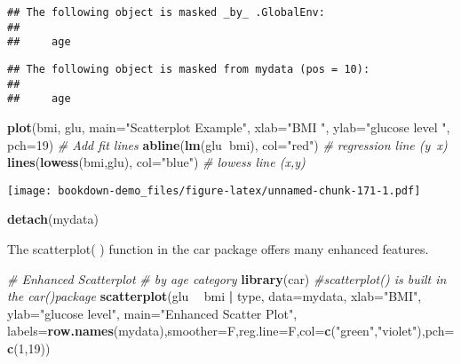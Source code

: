 \documentclass[]{book}
\newenvironment{Shaded}{\begin{snugshade}}{\end{snugshade}}
\newcommand{\KeywordTok}[1]{\textcolor[rgb]{0.13,0.29,0.53}{\textbf{#1}}}
\newcommand{\DataTypeTok}[1]{\textcolor[rgb]{0.13,0.29,0.53}{#1}}
\newcommand{\DecValTok}[1]{\textcolor[rgb]{0.00,0.00,0.81}{#1}}
\newcommand{\StringTok}[1]{\textcolor[rgb]{0.31,0.60,0.02}{#1}}
\newcommand{\CommentTok}[1]{\textcolor[rgb]{0.56,0.35,0.01}{\textit{#1}}}
\newcommand{\OperatorTok}[1]{\textcolor[rgb]{0.81,0.36,0.00}{\textbf{#1}}}
\newcommand{\NormalTok}[1]{#1}
\theoremstyle{definition}
\theoremstyle{definition}
\theoremstyle{definition}
\theoremstyle{remark}
\begin{document}
\begin{verbatim}
## The following object is masked _by_ .GlobalEnv:
## 
##     age
\end{verbatim}

\begin{verbatim}
## The following object is masked from mydata (pos = 10):
## 
##     age
\end{verbatim}

\begin{Shaded}
\begin{Highlighting}[]
\KeywordTok{plot}\NormalTok{(bmi, glu, }\DataTypeTok{main=}\StringTok{"Scatterplot Example"}\NormalTok{, }
    \DataTypeTok{xlab=}\StringTok{"BMI "}\NormalTok{, }\DataTypeTok{ylab=}\StringTok{"glucose level "}\NormalTok{, }\DataTypeTok{pch=}\DecValTok{19}\NormalTok{)}
\CommentTok{# Add fit lines}
\KeywordTok{abline}\NormalTok{(}\KeywordTok{lm}\NormalTok{(glu}\OperatorTok{~}\NormalTok{bmi), }\DataTypeTok{col=}\StringTok{"red"}\NormalTok{) }\CommentTok{# regression line (y~x) }
\KeywordTok{lines}\NormalTok{(}\KeywordTok{lowess}\NormalTok{(bmi,glu), }\DataTypeTok{col=}\StringTok{"blue"}\NormalTok{) }\CommentTok{# lowess line (x,y)}
\end{Highlighting}
\end{Shaded}

\texttt{[image: bookdown-demo\_files/figure-latex/unnamed-chunk-171-1.pdf]}

\begin{Shaded}
\begin{Highlighting}[]
\KeywordTok{detach}\NormalTok{(mydata)}
\end{Highlighting}
\end{Shaded}

The scatterplot( ) function in the car package offers many enhanced
features.

\begin{Shaded}
\begin{Highlighting}[]
\CommentTok{# Enhanced Scatterplot }
\CommentTok{# by age category}
\KeywordTok{library}\NormalTok{(car) }\CommentTok{#scatterplot() is built in the car()package}
\KeywordTok{scatterplot}\NormalTok{(glu }\OperatorTok{~}\StringTok{ }\NormalTok{bmi }\OperatorTok{|}\StringTok{ }\NormalTok{type, }\DataTypeTok{data=}\NormalTok{mydata, }
    \DataTypeTok{xlab=}\StringTok{"BMI"}\NormalTok{, }\DataTypeTok{ylab=}\StringTok{"glucose level"}\NormalTok{, }
   \DataTypeTok{main=}\StringTok{"Enhanced Scatter Plot"}\NormalTok{, }
   \DataTypeTok{labels=}\KeywordTok{row.names}\NormalTok{(mydata),}\DataTypeTok{smoother=}\NormalTok{F,}\DataTypeTok{reg.line=}\NormalTok{F,}\DataTypeTok{col=}\KeywordTok{c}\NormalTok{(}\StringTok{"green"}\NormalTok{,}\StringTok{"violet"}\NormalTok{),}\DataTypeTok{pch=}\KeywordTok{c}\NormalTok{(}\DecValTok{1}\NormalTok{,}\DecValTok{19}\NormalTok{))}
\end{Highlighting}
\end{Shaded}
\end{document}
